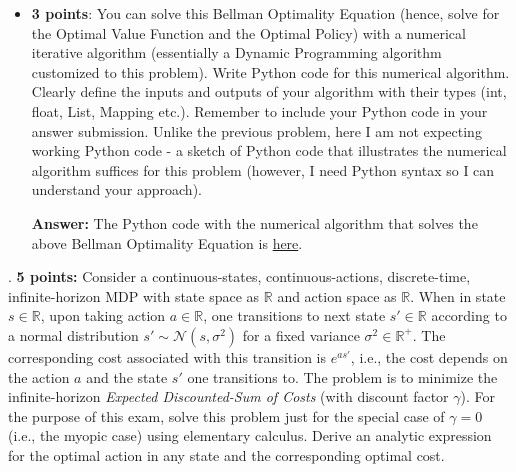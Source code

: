 \documentclass[12pt]{exam}
\begin{document}
\begin{questions}
\begin{itemize}
\item {\bf 3 points}: You can solve this Bellman Optimality Equation (hence, solve for the Optimal Value Function and the Optimal Policy) with a numerical iterative algorithm (essentially a Dynamic Programming algorithm customized to this problem). Write Python code for this numerical algorithm. Clearly define the inputs and outputs of your algorithm with their types (int, float, List, Mapping etc.). Remember to include your Python code in your answer submission. Unlike the previous problem, here I am not expecting working Python code - a sketch of Python code that illustrates the numerical algorithm suffices for this problem (however, I need Python syntax so I can understand your approach).

{\bf Answer:} The Python code with the numerical algorithm that solves the above Bellman Optimality Equation is \href{https://github.com/coverdrive/MDP-DP-RL/blob/master/src/examples/wage_max.py}{here}.

\end{itemize}

. {\bf 5 points:} Consider a continuous-states, continuous-actions, discrete-time, infinite-horizon MDP with state space as $\mathbb{R}$ and action space as $\mathbb{R}$. When in state $s\in \mathbb{R}$, upon taking action $a\in \mathbb{R}$, one transitions to next state $s' \in \mathbb{R}$ according to a normal distribution $s' \sim \mathcal{N}(s, \sigma^2)$ for a fixed variance $\sigma^2 \in \mathbb{R}^+$. The corresponding cost associated with this transition is $e^{as'}$, i.e., the cost depends on the action $a$ and the state $s'$ one transitions to. The problem is to minimize the  infinite-horizon {\em Expected Discounted-Sum of Costs} (with discount factor $\gamma$). For the purpose of this exam, solve this problem just for the special case of $\gamma = 0$ (i.e., the myopic case) using elementary calculus. Derive an analytic expression for the optimal action in any state and the corresponding optimal cost.


\end{questions}
\end{document}

